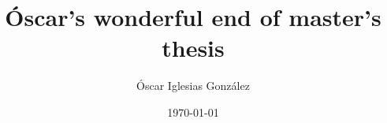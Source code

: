 \documentclass[
	fontsize=10pt, %
	twoside=true, %
	numbers=noenddot, %
]{kaobook}
\begin{document}

\titlehead{EOMT}

\title[Óscar's wonderful end of master's thesis]{Óscar's wonderful end of master's thesis}

\author[oscarigrexas]{Óscar Iglesias González}

\date{\today}

\publishers{CC Ediciones, Oscar's Room HQ}


\frontmatter %




\makeatletter
\uppertitleback{\@titlehead} %
\end{document}
